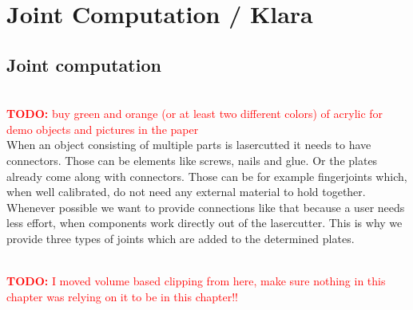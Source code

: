\documentclass[../ClassicThesis.tex]{subfiles}
\begin{document}
\chapter{Joint Computation / Klara}\label{ch:joints}
\newcommand{\TODO}[1]{\textcolor{red}{\\ \textbf{TODO:} #1 \\}}


\section{Joint computation}
\TODO{buy green and orange (or at least two different colors) of acrylic for demo objects and pictures in the paper}
When an object consisting of multiple parts is lasercutted it needs to have connectors. Those can be elements like screws, nails and glue. Or the plates already come along with connectors. Those can be for example fingerjoints which, when well calibrated, do not need any external material to hold together. \\
Whenever possible we want to provide connections like that because a user needs less effort, when components work directly out of the lasercutter. This is why we provide three types of joints which are added to the determined plates.

\TODO{I moved volume based clipping from here, make sure nothing in this chapter was relying on it to be in this chapter!!}
\end{document}
